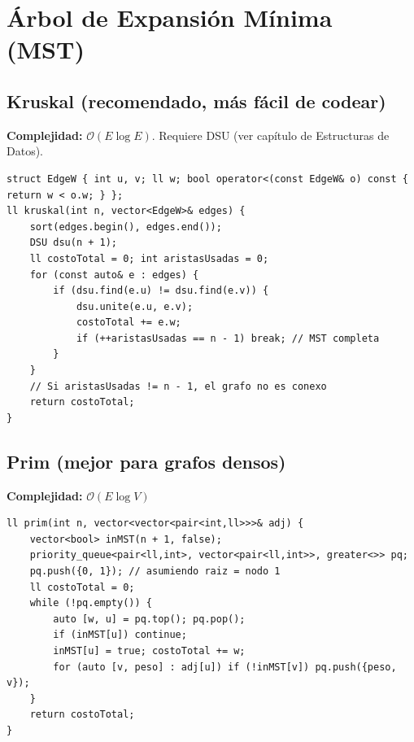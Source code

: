 \documentclass[10pt,twocolumn,letterpaper]{report}
\begin{document}
\section{Árbol de Expansión Mínima (MST)}

\subsection{Kruskal (recomendado, más fácil de codear)}
\textbf{Complejidad:} $\mathcal{O}(E \log E)$. Requiere DSU (ver capítulo de Estructuras de Datos).
\begin{lstlisting}
struct EdgeW { int u, v; ll w; bool operator<(const EdgeW& o) const { return w < o.w; } };
ll kruskal(int n, vector<EdgeW>& edges) {
    sort(edges.begin(), edges.end());
    DSU dsu(n + 1);
    ll costoTotal = 0; int aristasUsadas = 0;
    for (const auto& e : edges) {
        if (dsu.find(e.u) != dsu.find(e.v)) {
            dsu.unite(e.u, e.v);
            costoTotal += e.w;
            if (++aristasUsadas == n - 1) break; // MST completa
        }
    }
    // Si aristasUsadas != n - 1, el grafo no es conexo
    return costoTotal;
}
\end{lstlisting}

\subsection{Prim (mejor para grafos densos)}
\textbf{Complejidad:} $\mathcal{O}(E \log V)$
\begin{lstlisting}
ll prim(int n, vector<vector<pair<int,ll>>>& adj) {
    vector<bool> inMST(n + 1, false);
    priority_queue<pair<ll,int>, vector<pair<ll,int>>, greater<>> pq;
    pq.push({0, 1}); // asumiendo raiz = nodo 1
    ll costoTotal = 0;
    while (!pq.empty()) {
        auto [w, u] = pq.top(); pq.pop();
        if (inMST[u]) continue;
        inMST[u] = true; costoTotal += w;
        for (auto [v, peso] : adj[u]) if (!inMST[v]) pq.push({peso, v});
    }
    return costoTotal;
}
\end{lstlisting}

\end{document}
